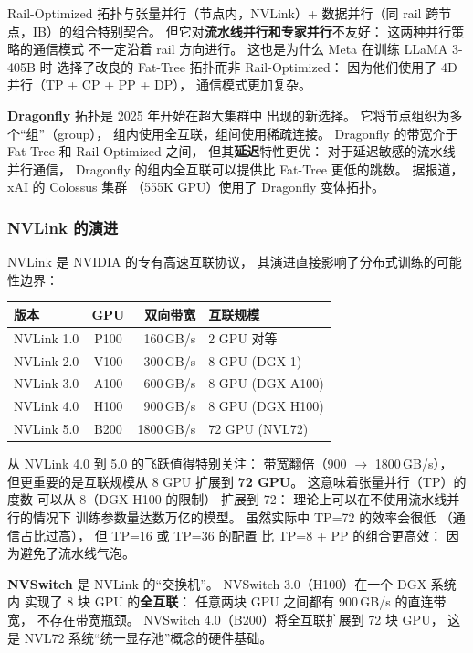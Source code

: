 Rail-Optimized 拓扑与张量并行（节点内，NVLink）+
数据并行（同 rail 跨节点，IB）的组合特别契合。
但它对\textbf{流水线并行和专家并行}不友好：
这两种并行策略的通信模式
不一定沿着 rail 方向进行。
这也是为什么 Meta 在训练 LLaMA 3-405B 时
选择了改良的 Fat-Tree 拓扑而非 Rail-Optimized：
因为他们使用了 4D 并行（TP + CP + PP + DP），
通信模式更加复杂。

\textbf{Dragonfly} 拓扑是 2025 年开始在超大集群中
出现的新选择。
它将节点组织为多个“组”（group），
组内使用全互联，组间使用稀疏连接。
Dragonfly 的带宽介于 Fat-Tree 和 Rail-Optimized 之间，
但其\textbf{延迟}特性更优：
对于延迟敏感的流水线并行通信，
Dragonfly 的组内全互联可以提供比 Fat-Tree 更低的跳数。
据报道，xAI 的 Colossus 集群
（555K GPU）使用了 Dragonfly 变体拓扑。

\subsubsection{NVLink 的演进}

NVLink 是 NVIDIA 的专有高速互联协议，
其演进直接影响了分布式训练的可能性边界：

\begin{center}\small
\renewcommand{\arraystretch}{1.3}
\begin{tabular}{lcrl}
\toprule
\rowcolor{figLightGray}
\textbf{版本} & \textbf{GPU} & \textbf{双向带宽} & \textbf{互联规模} \\
\midrule
NVLink 1.0 & P100 & 160\,GB/s & 2 GPU 对等 \\
NVLink 2.0 & V100 & 300\,GB/s & 8 GPU (DGX-1) \\
NVLink 3.0 & A100 & 600\,GB/s & 8 GPU (DGX A100) \\
NVLink 4.0 & H100 & 900\,GB/s & 8 GPU (DGX H100) \\
NVLink 5.0 & B200 & 1800\,GB/s & 72 GPU (NVL72) \\
\bottomrule
\end{tabular}
\end{center}

从 NVLink 4.0 到 5.0 的飞跃值得特别关注：
带宽翻倍（900 $\to$ 1800\,GB/s），
但更重要的是互联规模从 8 GPU 扩展到 \textbf{72 GPU}。
这意味着张量并行（TP）的度数
可以从 8（DGX H100 的限制）
扩展到 72：
理论上可以在不使用流水线并行的情况下
训练参数量达数万亿的模型。
虽然实际中 TP=72 的效率会很低
（通信占比过高），
但 TP=16 或 TP=36 的配置
比 TP=8 + PP 的组合更高效：
因为避免了流水线气泡。

\textbf{NVSwitch} 是 NVLink 的“交换机”。
NVSwitch 3.0（H100）在一个 DGX 系统内
实现了 8 块 GPU 的\textbf{全互联}：
任意两块 GPU 之间都有 900\,GB/s 的直连带宽，
不存在带宽瓶颈。
NVSwitch 4.0（B200）将全互联扩展到 72 块 GPU，
这是 NVL72 系统“统一显存池”概念的硬件基础。

